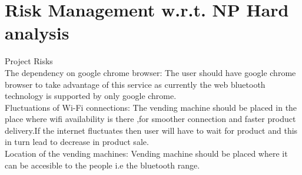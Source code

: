 \documentclass[oneside,a4paper,12pt]{report}
\begin{document}
\section{Risk Management w.r.t. NP Hard analysis}
Project Risks \\
The dependency on google chrome browser: The user should have google chrome browser to take advantage of this service as currently the web bluetooth technology is supported by only google chrome.\\
Fluctuations of Wi-Fi connections: The vending machine should be placed in the place where wifi availability is there ,for smoother connection and faster product delivery.If the internet fluctuates then user will have to wait for product and this in turn lead to decrease in product sale.\\
Location of the vending machines: Vending machine should be placed where it can be accesible to the people i.e the bluetooth range.\\
 
\end{document}
